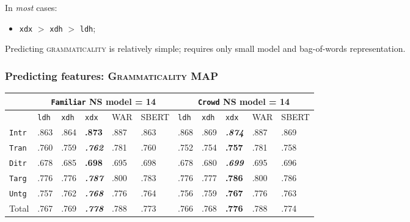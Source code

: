 \documentclass[handout,xcolor={dvipsnames}]{beamer}
\newcommand{\feat}[1]{\textsc{#1}}
\newcommand{\param}[1]{\texttt{#1}}
\begin{document}
\begin{frame}
\pause
In \textit{most} cases:
\begin{itemize}
\pause
\item \param{xdx} $>$ \param{xdh} $>$ \param{ldh};
\end{itemize}

\vspace{1em}

\pause
Predicting \feat{grammaticality} is relatively simple; requires only small model and bag-of-words representation.

\end{frame}

\begin{frame}
\frametitle{Predicting features: \feat{Grammaticality} MAP}

\small

\begin{table}[htb!]
\begin{center}
\setlength{\tabcolsep}{.35em}
\begin{tabular}{|l||l|l|l||l|l||l|l|l||l|l|}
\hline
 & \multicolumn{5}{c||}{\param{Fam\-il\-iar} NS model = 14} & \multicolumn{5}{c|}{\param{Crowd} NS model = 14} \\
\hline
    		& \param{ldh}	& \param{xdh} &	\param{xdx} & WAR	& {\scriptsize SBERT} & \param{ldh}	& \param{xdh} &	\param{xdx} & WAR	& {\scriptsize SBERT} \\ \hline
\hline
\param{Intr}  & .863 & .864 & \textbf{.873}          & .887 & .863 & .868 & .869 & \textit{\textbf{.874}} & .887 & .869 \\ \hline
\param{Tran}  & .760 & .759 & \textit{\textbf{.762}} & .781 & .760 & .752 & .754 & \textbf{.757}          & .781 & .758 \\ \hline
\param{Ditr}  & .678 & .685 & \textbf{.698}          & .695 & .698 & .678 & .680 & \textit{\textbf{.699}} & .695 & .696 \\ \hline
\hline
\param{Targ}  & .776 & .776 & \textit{\textbf{.787}} & .800 & .783 & .776 & .777 & \textbf{.786}          & .800 & .786 \\ \hline
\param{Untg}  & .757 & .762 & \textit{\textbf{.768}} & .776 & .764 & .756 & .759 & \textbf{.767}          & .776 & .763 \\ \hline
\hline
Total & .767 & .769 & \textit{\textbf{.778}} & .788 & .773 & .766 & .768 & \textbf{.776}          & .788 & .774 \\ \hline
\end{tabular}


\end{center}
\end{table}
\end{frame}
\end{document}
